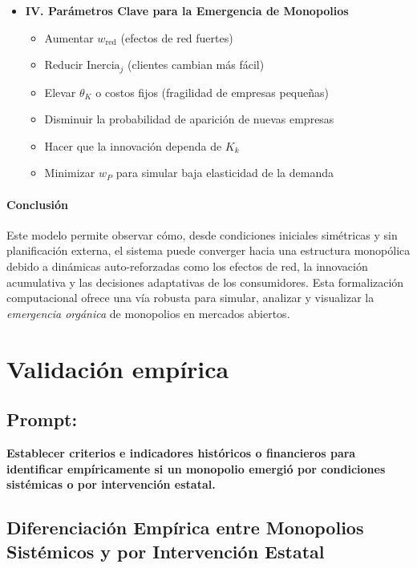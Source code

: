 \documentclass[a4paper,12pt]{article}
\begin{document}
\begin{itemize}
    \item \textbf{IV. Parámetros Clave para la Emergencia de Monopolios}

    \begin{itemize}
        \item Aumentar $w_{\text{red}}$ (efectos de red fuertes)
        \item Reducir $\text{Inercia}_j$ (clientes cambian más fácil)
        \item Elevar $\theta_K$ o costos fijos (fragilidad de empresas pequeñas)
        \item Disminuir la probabilidad de aparición de nuevas empresas
        \item Hacer que la innovación dependa de $K_k$
        \item Minimizar $w_P$ para simular baja elasticidad de la demanda
    \end{itemize}
\end{itemize}

\paragraph{Conclusión} Este modelo permite observar cómo, desde condiciones iniciales simétricas y sin planificación externa, el sistema puede converger hacia una estructura monopólica debido a dinámicas auto-reforzadas como los efectos de red, la innovación acumulativa y las decisiones adaptativas de los consumidores. Esta formalización computacional ofrece una vía robusta para simular, analizar y visualizar la \textit{emergencia orgánica} de monopolios en mercados abiertos.


\section*{Validación empírica}

\subsection*{Prompt:}
\textbf{Establecer criterios e indicadores históricos o financieros para identificar empíricamente si un monopolio emergió por condiciones sistémicas o por intervención estatal.}

\subsection*{Diferenciación Empírica entre Monopolios Sistémicos y por Intervención Estatal}
\end{document}
